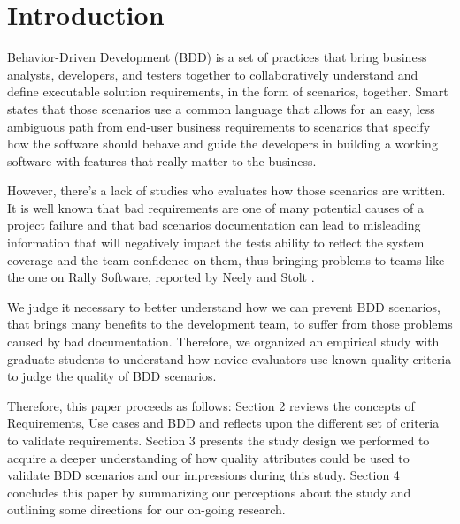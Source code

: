 \section{Introduction}

Behavior-Driven Development (BDD) is a set of practices that bring business analysts, developers, and testers together to collaboratively understand and define executable  solution requirements, in the form of scenarios, together. Smart \cite{Smart_2014} states that those scenarios use a common language that allows for an easy, less ambiguous path from end-user business requirements to scenarios that specify how the software should behave and guide the developers in building a working software with features that really matter to the business. 

However, there's a lack of studies who evaluates how those scenarios are written. It is well known that bad requirements are one of many potential causes of a project failure \cite{Kamata_and_Tamai_2015} and that bad scenarios documentation can lead to misleading information that will negatively impact the tests ability to reflect the system coverage and the team confidence on them, thus bringing problems to teams like the one on Rally Software, reported by Neely and Stolt \cite{Neely_Stolt_2013}.

We judge it necessary to better understand how we can prevent BDD scenarios, that brings many benefits to the development team, to suffer from those problems caused by bad documentation. Therefore, we organized an empirical study with graduate students to understand how novice evaluators use known quality criteria to judge the quality of BDD scenarios.

Therefore, this paper proceeds as follows: Section 2 reviews the concepts of Requirements, Use cases and BDD and reflects upon the different set of criteria to validate requirements. Section 3 presents the study design we performed to acquire a deeper understanding of how quality attributes could be used to validate BDD scenarios and our impressions during this study. Section 4 concludes this paper by summarizing our perceptions about the study and outlining some directions for our on-going research.